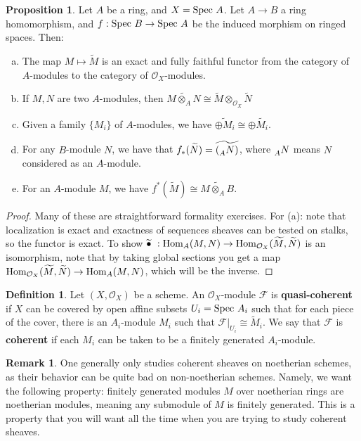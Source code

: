 \documentclass[10pt,reqno]{amsart}
\theoremstyle{definition}
\newtheorem{definition}[theorem]{Definition}
\newtheorem{proposition}[theorem]{Proposition}
\newtheorem{remark}[theorem]{Remark}
\theoremstyle{remark}
\numberwithin{equation}{section}
\numberwithin{theorem}{section}
\newcommand{\OO}{{\mathcal O}}
\newcommand{\spec}{\textup{Spec }}
\newcommand{\Hom}{\textup{Hom}}
\newcommand{\FF}{{\mathscr F}}
\newcommand{\wt}{\widetilde}
\begin{document}
\begin{proposition}\label{prop:tilde-properties} Let $A$ be a ring, and $X = \spec A$. Let $A \to B$ a ring homomorphism, and $f: \spec B \to \spec A$ be the induced morphism on ringed spaces. Then:
\begin{enumerate}[(a)]
\item The map $M \mapsto \wt{M}$ is an exact and fully faithful functor from the category of $A$-modules to the category of $\OO_X$-modules.
\item If $M,N$ are two $A$-modules, then $\wt{M \otimes_A N} \cong \wt{M} \otimes_{\OO_X} \wt{N}$
\item Given a family $\{M_i\}$ of $A$-modules, we have $\wt{\oplus M_i} \cong \oplus \wt{M_i}$.
\item For any $B$-module $N$, we have that $f_*(\wt{N}) = \wt{(\prescript{}{A}{N})}$, where $\prescript{}{A}{N}$ means $N$ considered as an $A$-module.
\item For an $A$-module $M$, we have $f^*(\wt{M}) \cong \wt{M \otimes_A B}$.
\end{enumerate}
\end{proposition}
\begin{proof}
Many of these are straightforward formality exercises. For (a): note that localization is exact and exactness of sequences sheaves can be tested on stalks, so the functor is exact. To show $\widetilde{\bullet} \ : \Hom_A(M,N) \to \Hom_{\OO_X}(\wt{M},\wt{N})$ is an isomorphism, note that by taking global sections you get a map $\Hom_{\OO_X}(\wt{M},\wt{N}) \to \Hom_A(M,N)$, which will be the inverse.
\end{proof}

\begin{definition} Let $(X,\OO_X)$ be a scheme. An $\OO_X$-module $\FF$ is \textbf{quasi-coherent} if $X$ can be covered by open affine subsets $U_i  = \spec A_i$ such that for each piece of the cover, there is an $A_i$-module $M_i$ such that $\FF|_{U_i} \cong \wt{M}_i$. We say that $\FF$ is \textbf{coherent} if each $M_i$ can be taken to be a finitely generated $A_i$-module.
\end{definition}

\begin{remark} One generally only studies coherent sheaves on noetherian schemes, as their behavior can be quite bad on non-noetherian schemes. Namely, we want the following property: finitely generated modules $M$ over noetherian rings are noetherian modules, meaning any submodule of $M$ is finitely generated. This is a property that you will want all the time when you are trying to study coherent sheaves.
\end{remark}
\end{document}
